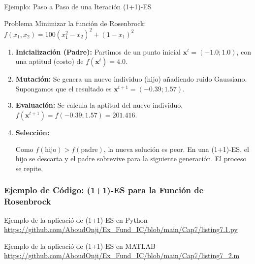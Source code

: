 \documentclass[aspectratio=169,xcolor=dvipsnames]{beamer}
\begin{document}
\begin{frame}{Ejemplo: Paso a Paso de una Iteración (1+1)-ES}
    \begin{block}{Problema}
    Minimizar la función de Rosenbrock: $f(x_1, x_2) = 100(x_1^2 - x_2)^2 + (1-x_1)^2$
    \end{block}
                    \footnotesize

    \begin{enumerate}
        \item \textbf{Inicialización (Padre):} Partimos de un punto inicial $\mathbf{x}^t = (-1.0 ; 1.0)$, con una aptitud (costo) de $f(\mathbf{x}^t) = 4.0$. \pause
        
        \item \textbf{Mutación:} Se genera un nuevo individuo (hijo) añadiendo ruido Gaussiano. \\
        Supongamos que el resultado es $\mathbf{x}^{t+1} = (-0.39; 1.57)$. \pause
        
        \item \textbf{Evaluación:} Se calcula la aptitud del nuevo individuo. \\
        $f(\mathbf{x}^{t+1}) = f(-0.39; 1.57) = 201.416$. \pause
        
        \item \textbf{Selección:} 
        \begin{alertblock}{}
        Como $f(\text{hijo}) > f(\text{padre})$, la nueva solución es peor. En una (1+1)-ES, el hijo se descarta y el padre sobrevive para la siguiente generación. El proceso se repite.
        \end{alertblock}
    \end{enumerate}
\end{frame}


\begin{frame}[fragile]
    \frametitle{Ejemplo de Código: (1+1)-ES para la Función de Rosenbrock}
    \begin{block}{Ejemplo de la aplicació de (1+1)-ES en Python}
        \url{https://github.com/AboudOnji/Ex_Fund_IC/blob/main/Cap7/listing7.1.py}
    \end{block}
    \begin{block}{Ejemplo de la aplicació de (1+1)-ES en MATLAB}
        \url{https://github.com/AboudOnji/Ex_Fund_IC/blob/main/Cap7/listing7_2.m}
    \end{block}
\end{frame}
\end{document}
